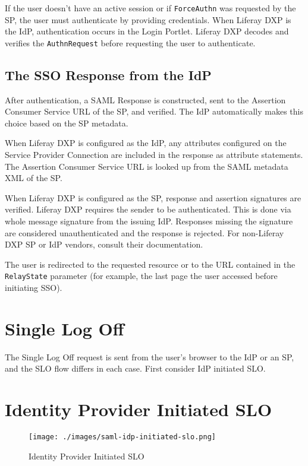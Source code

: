 If the user doesn't have an active session or if \texttt{ForceAuthn} was
requested by the SP, the user must authenticate by providing
credentials. When Liferay DXP is the IdP, authentication occurs in the
Login Portlet. Liferay DXP decodes and verifies the
\texttt{AuthnRequest} before requesting the user to authenticate.

\subsection{The SSO Response from the
IdP}\label{the-sso-response-from-the-idp-1}

After authentication, a SAML Response is constructed, sent to the
Assertion Consumer Service URL of the SP, and verified. The IdP
automatically makes this choice based on the SP metadata.

When Liferay DXP is configured as the IdP, any attributes configured on
the Service Provider Connection are included in the response as
attribute statements. The Assertion Consumer Service URL is looked up
from the SAML metadata XML of the SP.

When Liferay DXP is configured as the SP, response and assertion
signatures are verified. Liferay DXP requires the sender to be
authenticated. This is done via whole message signature from the issuing
IdP. Responses missing the signature are considered unauthenticated and
the response is rejected. For non-Liferay DXP SP or IdP vendors, consult
their documentation.

The user is redirected to the requested resource or to the URL contained
in the \texttt{RelayState} parameter (for example, the last page the
user accessed before initiating SSO).

\section{Single Log Off}\label{single-log-off}

The Single Log Off request is sent from the user's browser to the IdP or
an SP, and the SLO flow differs in each case. First consider IdP
initiated SLO.

\section{Identity Provider Initiated
SLO}\label{identity-provider-initiated-slo}

\begin{figure}
\centering
\texttt{[image: ./images/saml-idp-initiated-slo.png]}
\caption{Identity Provider Initiated SLO}
\end{figure}

